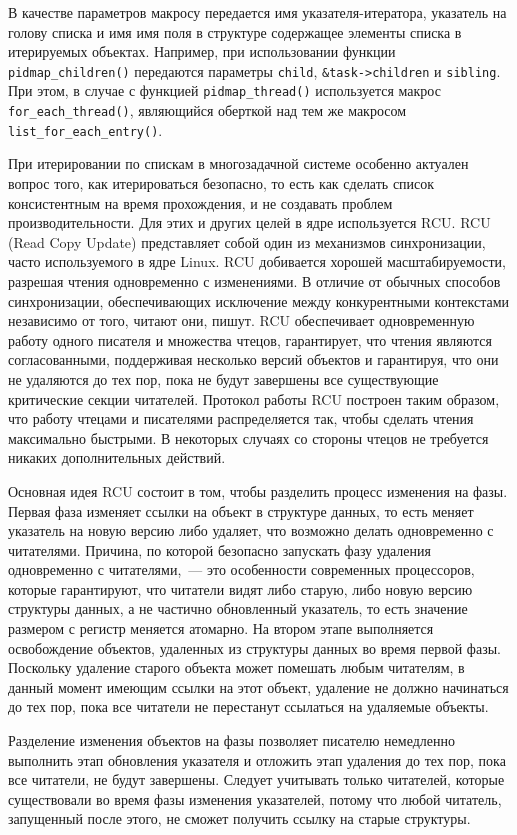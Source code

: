 В качестве параметров макросу передается имя указателя-итератора, указатель на
голову списка и имя имя поля в структуре содержащее элементы списка в
итерируемых объектах. Например, при использовании функции
\texttt{pidmap\_children()} передаются параметры \texttt{child},
\texttt{\&task->children} и \texttt{sibling}. При этом, в случае с функцией
\texttt{pidmap\_thread()} используется макрос \texttt{for\_each\_thread()},
являющийся оберткой над тем же макросом \texttt{list\_for\_each\_entry()}.

При итерировании по спискам в многозадачной системе особенно актуален вопрос
того, как итерироваться безопасно, то есть как сделать список консистентным на
время прохождения, и не создавать проблем производительности. Для этих и других
целей в ядре используется RCU. RCU (Read Copy Update) представляет собой один из
механизмов синхронизации, часто используемого в ядре Linux. RCU добивается
хорошей масштабируемости, разрешая чтения одновременно
с изменениями. В отличие от обычных способов синхронизации, обеспечивающих
исключение между конкурентными контекстами независимо от того, читают они,
пишут. RCU обеспечивает одновременную работу одного писателя и множества чтецов,
гарантирует, что чтения являются согласованными, поддерживая несколько версий
объектов и гарантируя, что они не удаляются до тех пор, пока не будут завершены
все существующие критические секции читателей. Протокол работы RCU построен
таким образом, что работу чтецами и писателями распределяется так, чтобы сделать
чтения максимально быстрыми. В некоторых случаях со стороны чтецов не требуется
никаких дополнительных действий.

Основная идея RCU состоит в том, чтобы разделить процесс изменения на фазы.
Первая фаза изменяет ссылки на объект в структуре данных, то есть меняет
указатель на новую версию либо удаляет, что возможно делать одновременно с
читателями. Причина, по которой безопасно запускать фазу удаления одновременно с
читателями,~--- это особенности современных процессоров, которые гарантируют,
что читатели видят либо старую, либо новую версию структуры данных, а не
частично обновленный указатель, то есть значение размером с регистр меняется
атомарно. На втором этапе выполняется освобождение объектов, удаленных из
структуры данных во время первой фазы. Поскольку удаление старого объекта может
помешать любым читателям, в данный момент имеющим ссылки на этот объект,
удаление не должно начинаться до тех пор, пока все читатели не перестанут
ссылаться на удаляемые объекты.

Разделение изменения объектов на фазы позволяет писателю немедленно выполнить
этап обновления указателя и отложить этап удаления до тех пор, пока все
читатели, не будут завершены. Следует учитывать только читателей, которые
существовали во время фазы изменения указателей, потому что любой читатель,
запущенный после этого, не сможет получить ссылку на старые структуры.

